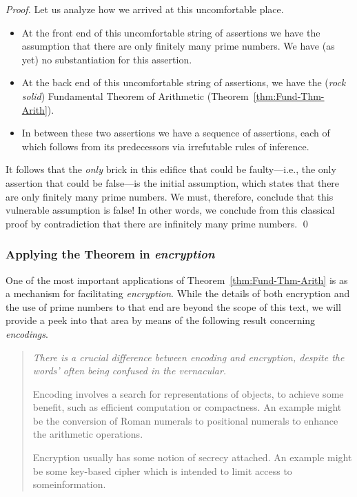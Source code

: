 \begin{proof}
Let us analyze how we arrived at this uncomfortable place.
\begin{itemize}
\item
At the front end of this uncomfortable string of assertions we have
the assumption that there are only finitely many prime numbers.  We
have (as yet) no substantiation for this assertion.
\item
At the back end of this uncomfortable string of assertions, we have
the ({\em rock solid}) Fundamental Theorem of Arithmetic
(Theorem~\ref{thm:Fund-Thm-Arith}).
\item
In between these two assertions we have a sequence of assertions, each
of which follows from its predecessors via irrefutable rules of
inference.
\end{itemize}
It follows that the {\em only} brick in this edifice that could be
faulty---i.e., the only assertion that could be false---is the initial
assumption, which states that there are only finitely many prime
numbers.  We must, therefore, conclude that this vulnerable assumption
is false!  In other words, we conclude from this classical proof by
contradiction that there are infinitely many prime numbers.  \qed
\end{proof}


\subsubsection{Applying the Theorem in {\em encryption}}
\label{sec:Primes-and-encryption}

One of the most important applications of Theorem~\ref{thm:Fund-Thm-Arith} is
as a mechanism for facilitating {\em encryption}.
%
While the details of both encryption and the use of prime numbers to
that end are beyond the scope of this text, we will provide a peek
into that area by means of the following result concerning {\it
  encodings}.
\begin{quote}
{\em 
There is a crucial difference between {\em encoding} and {\em
  encryption}, despite the words' often being confused in the
vernacular.

Encoding involves a search for representations of objects, to achieve
some benefit, such as efficient computation or compactness.  An
example might be the conversion of Roman numerals to positional
numerals to enhance the arithmetic operations.

Encryption usually has some notion of secrecy attached.  An example
might be some key-based cipher which is intended to limit access to
someinformation.  }
\end{quote}



